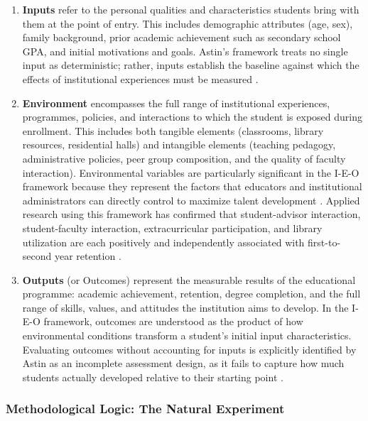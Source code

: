 \documentclass[12pt]{report}
\begin{document}
\begin{enumerate}
    \item \textbf{Inputs} refer to the personal qualities and characteristics
    students bring with them at the point of entry. This includes demographic
    attributes (age, sex), family background, prior academic achievement such
    as secondary school GPA, and initial motivations and goals. Astin's
    framework treats no single input as deterministic; rather, inputs establish
    the baseline against which the effects of institutional experiences must
    be measured \parencite{astin2012}.

    \item \textbf{Environment} encompasses the full range of institutional
    experiences, programmes, policies, and interactions to which the student
    is exposed during enrollment. This includes both tangible elements
    (classrooms, library resources, residential halls) and intangible
    elements (teaching pedagogy, administrative policies, peer group
    composition, and the quality of faculty interaction). Environmental
    variables are particularly significant in the I-E-O framework because
    they represent the factors that educators and institutional administrators
    can directly control to maximize talent development
    \parencite{astin2012}. Applied research using this framework has
    confirmed that student-advisor interaction, student-faculty interaction,
    extracurricular participation, and library utilization are each positively
    and independently associated with first-to-second year retention
    \parencite{Xiao2020}.

    \item \textbf{Outputs} (or Outcomes) represent the measurable results of
    the educational programme: academic achievement, retention, degree
    completion, and the full range of skills, values, and attitudes the
    institution aims to develop. In the I-E-O framework, outcomes are
    understood as the product of how environmental conditions transform a
    student's initial input characteristics. Evaluating outcomes without
    accounting for inputs is explicitly identified by Astin as an incomplete
    assessment design, as it fails to capture how much students actually
    developed relative to their starting point \parencite{astin2012}.
\end{enumerate}

\subsubsection{Methodological Logic: The Natural Experiment}
\end{document}
